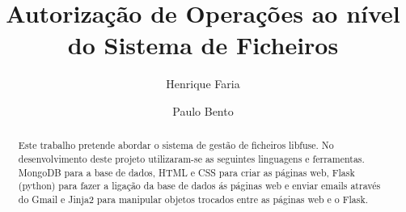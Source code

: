 

\title{Autorização de Operações ao nível do Sistema de Ficheiros}

\author{Henrique Faria \and Paulo Bento}




\maketitle

\begin{abstract}
Este trabalho pretende abordar o sistema de gestão de ficheiros libfuse. No desenvolvimento deste projeto utilizaram-se as seguintes linguagens e ferramentas. MongoDB para a base de dados, HTML e CSS para criar as páginas web, Flask (python) para fazer a ligação da base de dados ás páginas web e enviar emails através do Gmail e Jinja2 para manipular objetos trocados entre as páginas web e o Flask.

\end{abstract}
\newpage

